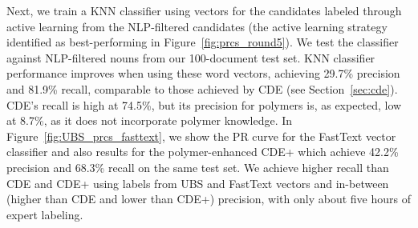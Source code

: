 Next, we train a KNN classifier using vectors for the candidates labeled through active learning from the NLP-filtered candidates (the active learning strategy identified as best-performing in Figure~\ref{fig:prcs_round5}).
We test the classifier against NLP-filtered nouns from our 100-document test set.
KNN classifier performance improves when using these word vectors, 
achieving 29.7\% precision and 81.9\% recall,
comparable to those achieved by CDE (see Section~\ref{sec:cde}).
CDE's recall is high
at 74.5\%, but its precision for polymers is, as expected, low at 8.7\%, as it does not incorporate polymer knowledge. 
In Figure~\ref{fig:UBS_prcs_fasttext}, we show the PR curve for the FastText vector classifier
and also results for the polymer-enhanced CDE+
which achieve 42.2\% precision and 68.3\% recall on the same test set.%
We achieve higher recall than CDE and CDE+ using labels from UBS and FastText vectors 
and in-between (higher than CDE and lower than CDE+)
precision, with only about five hours of expert labeling.

